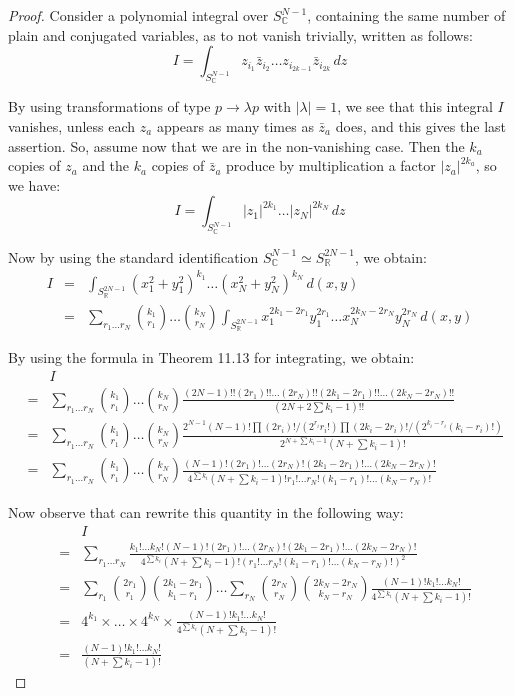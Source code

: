 \documentclass[12pt]{amsbook}
\begin{document}
\begin{proof}
Consider a polynomial integral over $S^{N-1}_\mathbb C$, containing the same number of plain and conjugated variables, as to not vanish trivially, written as follows:
$$I=\int_{S^{N-1}_\mathbb C}z_{i_1}\bar{z}_{i_2}\ldots z_{i_{2k-1}}\bar{z}_{i_{2k}}\,dz$$

By using transformations of type $p\to\lambda p$ with $|\lambda|=1$, we see that this integral $I$ vanishes, unless each $z_a$ appears as many times as $\bar{z}_a$ does, and this gives the last assertion. So, assume now that we are in the non-vanishing case. Then the $k_a$ copies of $z_a$ and the $k_a$ copies of $\bar{z}_a$ produce by multiplication a factor $|z_a|^{2k_a}$, so we have:
$$I=\int_{S^{N-1}_\mathbb C}|z_1|^{2k_1}\ldots|z_N|^{2k_N}\,dz$$

Now by using the standard identification $S^{N-1}_\mathbb C\simeq S^{2N-1}_\mathbb R$, we obtain:
\begin{eqnarray*}
I
&=&\int_{S^{2N-1}_\mathbb R}(x_1^2+y_1^2)^{k_1}\ldots(x_N^2+y_N^2)^{k_N}\,d(x,y)\\
&=&\sum_{r_1\ldots r_N}\binom{k_1}{r_1}\ldots\binom{k_N}{r_N}\int_{S^{2N-1}_\mathbb R}x_1^{2k_1-2r_1}y_1^{2r_1}\ldots x_N^{2k_N-2r_N}y_N^{2r_N}\,d(x,y)
\end{eqnarray*}

By using the formula in Theorem 11.13 for integrating, we obtain:
\begin{eqnarray*}
&&I\\
&=&\sum_{r_1\ldots r_N}\binom{k_1}{r_1}\ldots\binom{k_N}{r_N}\frac{(2N-1)!!(2r_1)!!\ldots(2r_N)!!(2k_1-2r_1)!!\ldots (2k_N-2r_N)!!}{(2N+2\sum k_i-1)!!}\\
&=&\sum_{r_1\ldots r_N}\binom{k_1}{r_1}\ldots\binom{k_N}{r_N}\frac{2^{N-1}(N-1)!\prod(2r_i)!/(2^{r_i}r_i!)\prod(2k_i-2r_i)!/(2^{k_i-r_i}(k_i-r_i)!)}{2^{N+\sum k_i-1}(N+\sum k_i-1)!}\\
&=&\sum_{r_1\ldots r_N}\binom{k_1}{r_1}\ldots\binom{k_N}{r_N}
\frac{(N-1)!(2r_1)!\ldots (2r_N)!(2k_1-2r_1)!\ldots (2k_N-2r_N)!}{4^{\sum k_i}(N+\sum k_i-1)!r_1!\ldots r_N!(k_1-r_1)!\ldots (k_N-r_N)!}
\end{eqnarray*}

Now observe that can rewrite this quantity in the following way:
\begin{eqnarray*}
&&I\\
&=&\sum_{r_1\ldots r_N}\frac{k_1!\ldots k_N!(N-1)!(2r_1)!\ldots (2r_N)!(2k_1-2r_1)!\ldots (2k_N-2r_N)!}{4^{\sum k_i}(N+\sum k_i-1)!(r_1!\ldots r_N!(k_1-r_1)!\ldots (k_N-r_N)!)^2}\\
&=&\sum_{r_1}\binom{2r_1}{r_1}\binom{2k_1-2r_1}{k_1-r_1}\ldots\sum_{r_N}\binom{2r_N}{r_N}\binom{2k_N-2r_N}{k_N-r_N}\frac{(N-1)!k_1!\ldots k_N!}{4^{\sum k_i}(N+\sum k_i-1)!}\\
&=&4^{k_1}\times\ldots\times 4^{k_N}\times\frac{(N-1)!k_1!\ldots k_N!}{4^{\sum k_i}(N+\sum k_i-1)!}\\
&=&\frac{(N-1)!k_1!\ldots k_N!}{(N+\sum k_i-1)!}
\end{eqnarray*}


\end{proof}
\end{document}
